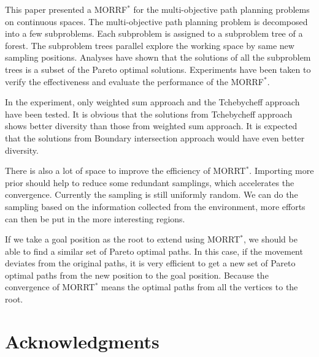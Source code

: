 \documentclass[conference]{IEEEtran}
\begin{document}
This paper presented a MORRF$^{*}$ for the multi-objective path planning problems on continuous spaces.
The multi-objective path planning problem is decomposed into a few subproblems.
Each subproblem is assigned to a subproblem tree of a forest.
The subproblem trees parallel explore the working space by same new sampling positions.
Analyses have shown that the solutions of all the subproblem trees is a subset of the Pareto optimal solutions.
Experiments have been taken to verify the effectiveness and evaluate the performance of the MORRF$^{*}$.

In the experiment, only weighted sum approach and the Tchebycheff approach have been tested. 
It is obvious that the solutions from Tchebycheff approach shows better diversity than those from weighted sum approach.
It is expected that the solutions from Boundary intersection approach would have even better diversity.

There is also a lot of space to improve the efficiency of MORRT$^{*} $.
Importing more prior should help to reduce some redundant samplings, which accelerates the convergence.
Currently the sampling is still uniformly random.
We can do the sampling based on the information collected from the environment, more efforts can then be put in the more interesting regions.

If we take a goal position as the root to extend using MORRT$^{*}$,
we should be able to find a similar set of Pareto optimal paths.
In this case, if the movement deviates from the original paths, it is very efficient to get a new set of Pareto optimal paths from the new position to the goal position.
Because the convergence of MORRT$^{*}$ means the optimal paths from all the vertices to the root.


\section*{Acknowledgments}




\end{document}
